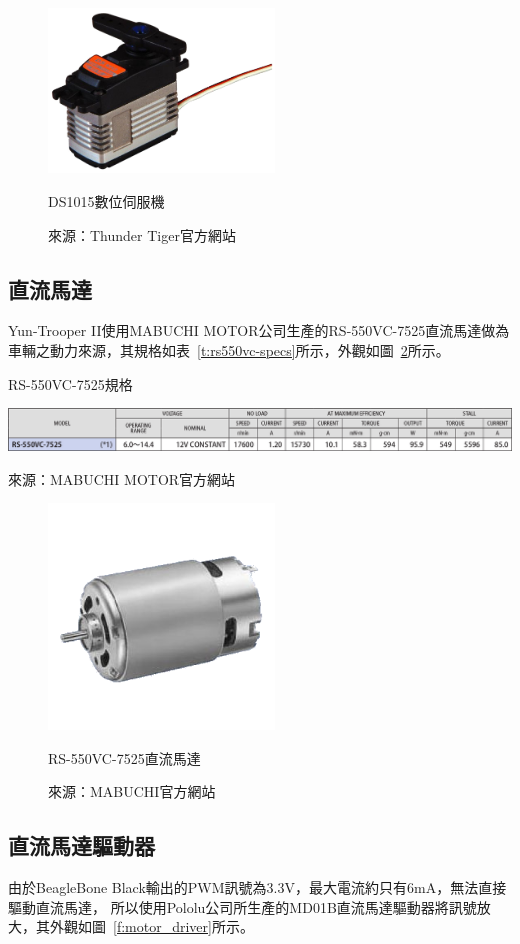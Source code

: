 \begin{figure}[h!]
	\centering
	\includegraphics[width=6cm]{figures/hardware/DS1015}
	\caption{DS1015數位伺服機}
	\caption*{來源：Thunder Tiger官方網站}
	\label{f:ds1015}
\end{figure}

\subsection{直流馬達}
Yun-Trooper II使用MABUCHI MOTOR公司生產的RS-550VC-7525直流馬達做為車輛之動力來源，其規格如表~\ref{t:rs550vc-specs}所示，外觀如圖~\ref{f:rs550vc}所示。

\begin{table}[h!]
	\centering
	\caption{RS-550VC-7525規格}
	\label{t:rs550vc-specs}
	\includegraphics[width=\textwidth]{tables/RS550VC-specs}
	\caption*{來源：MABUCHI MOTOR官方網站}
\end{table}

\begin{figure}[h!]
	\centering
	\includegraphics[width=6cm]{figures/hardware/motor}
	\caption{RS-550VC-7525直流馬達}
	\caption*{來源：MABUCHI官方網站}
	\label{f:rs550vc}
\end{figure}

\subsection{直流馬達驅動器}
由於BeagleBone Black輸出的PWM訊號為3.3V，最大電流約只有6mA，無法直接驅動直流馬達，
所以使用Pololu公司所生產的MD01B直流馬達驅動器將訊號放大，其外觀如圖~\ref{f:motor_driver}所示。


